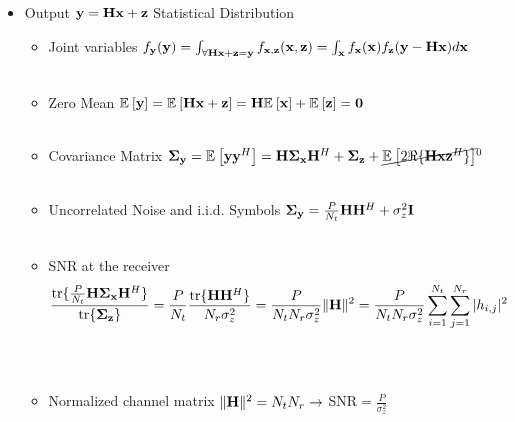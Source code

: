 \documentclass[xcolor=dvipsnames,aspectratio=169]{beamer}
\begin{document}
{\begin{itemize}
\begin{itemize}
$${\begin{array}{cccc}
                                               \vdots&\vdots&\ddots &\vdots\\
                                                x_{N_{t}}x_1^*&x_{N_{t}}x_2^*&\dots &|x_{N_{t}}|^2\\
                                               \end{array} \right)}$$
        \item I.I.D. Transmitted Signal $\Ex{}{x_2x_1^*}=0\Rightarrow \Sg_{\x}=\frac{P}{N_{t}}\I$\\ \ \\
        \item Example: Select $x_i$ from $N_{t}$ independent QPSK constellations.\\ \ \\
    \end{itemize}
    \pagebreak
    \item Output $\mathbf{y}=\mathbf{H} \mathbf{x} +\mathbf{z}$ Statistical Distribution
    \begin{itemize}
        \item Joint variables $f_{\mathbf{y}}(\mathbf{y})=\int_{\forall \mathbf{H}\mathbf{x}+\mathbf{z}=\mathbf{y}}f_{\mathbf{x},\mathbf{z}}(\mathbf{x},\mathbf{z})=\int_{\mathbf{x}} f_{\mathbf{x}}(\mathbf{x})f_{\mathbf{z}}(\mathbf{y}-\mathbf{H}\mathbf{x})d\mathbf{x}$ \\ \ \\
        \item Zero Mean ${\mathbb{E}_{}\left[\mathbf{y}\right]}={\mathbb{E}_{}\left[\mathbf{H}\mathbf{x}+\mathbf{z}\right]}=\mathbf{H}{\mathbb{E}_{}\left[\mathbf{x}\right]}+{\mathbb{E}_{}\left[\mathbf{z}\right]}=\mathbf{0}$\\ \ \\
        \item Covariance Matrix $\mathbf{\boldsymbol{\Sigma}}_{\mathbf{y}}={\mathbb{E}_{}\left[\mathbf{y} \mathbf{y}^H\right]}=\mathbf{H}\mathbf{\boldsymbol{\Sigma}}_{\mathbf{x}}\mathbf{H}^H+\mathbf{\boldsymbol{\Sigma}}_{\mathbf{z}}+\cancel{{\mathbb{E}_{}\left[2\Re\{\mathbf{H}\mathbf{x}\mathbf{z}^H\}\right]}}^{0}$\\ \ \\
        \item Uncorrelated Noise and i.i.d. Symbols $\mathbf{\boldsymbol{\Sigma}}_{\mathbf{y}}=\frac{P}{N_{t}}\mathbf{H}\mathbf{H}^H+\sigma_z^2\mathbf{I}$\\ \ \\
        \item SNR at the receiver 
        $$\frac{\textnormal{tr}\{\frac{P}{N_{t}}\mathbf{H}\mathbf{\boldsymbol{\Sigma}}_{\mathbf{x}}\mathbf{H}^H\}}{\textnormal{tr}\{\mathbf{\boldsymbol{\Sigma}}_{\mathbf{z}}\}}=\frac{P}{N_{t}}\frac{\textnormal{tr}\{\mathbf{H}\mathbf{H}^H\}}{N_{r}\sigma_z^2}=\frac{P}{N_{t}N_{r}\sigma_z^2}\|\mathbf{H}\|^2=\frac{P}{N_{t}N_{r}\sigma_z^2}\sum_{i=1}^{N_{t}}\sum_{j=1}^{N_{r}}|h_{i,j}|^2$$\\ \ \\
        \item Normalized channel matrix $\|\mathbf{H}\|^2=N_{t}N_{r}\to$ SNR$=\frac{P}{\sigma_z^2}$
    \end{itemize}
 \end{itemize}
}
\end{document}
